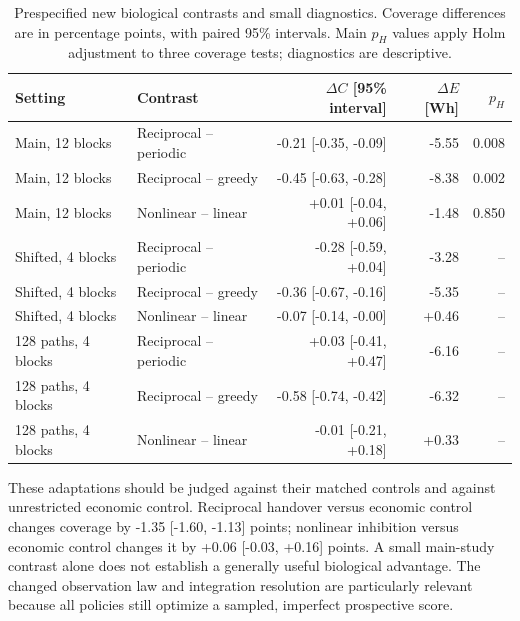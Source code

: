 \begin{table}[tbp]\centering\small
\caption{Prespecified new biological contrasts and small diagnostics. Coverage differences are in percentage points, with paired 95\% intervals. Main $p_H$ values apply Holm adjustment to three coverage tests; diagnostics are descriptive.}
\begin{tabular}{llrrr}\toprule Setting & Contrast & $\Delta C$ [95\% interval] & $\Delta E$ [Wh] & $p_H$\\\midrule
Main, 12 blocks & Reciprocal -- periodic & -0.21 [-0.35, -0.09] & -5.55 & 0.008 \\
Main, 12 blocks & Reciprocal -- greedy & -0.45 [-0.63, -0.28] & -8.38 & 0.002 \\
Main, 12 blocks & Nonlinear -- linear & +0.01 [-0.04, +0.06] & -1.48 & 0.850 \\
Shifted, 4 blocks & Reciprocal -- periodic & -0.28 [-0.59, +0.04] & -3.28 & -- \\
Shifted, 4 blocks & Reciprocal -- greedy & -0.36 [-0.67, -0.16] & -5.35 & -- \\
Shifted, 4 blocks & Nonlinear -- linear & -0.07 [-0.14, -0.00] & +0.46 & -- \\
128 paths, 4 blocks & Reciprocal -- periodic & +0.03 [-0.41, +0.47] & -6.16 & -- \\
128 paths, 4 blocks & Reciprocal -- greedy & -0.58 [-0.74, -0.42] & -6.32 & -- \\
128 paths, 4 blocks & Nonlinear -- linear & -0.01 [-0.21, +0.18] & +0.33 & -- \\
\bottomrule\end{tabular}\label{tab:v4contrasts}\end{table}
These adaptations should be judged against their matched controls and against unrestricted economic control. Reciprocal handover versus economic control changes coverage by -1.35 [-1.60, -1.13] points; nonlinear inhibition versus economic control changes it by +0.06 [-0.03, +0.16] points. A small main-study contrast alone does not establish a generally useful biological advantage. The changed observation law and integration resolution are particularly relevant because all policies still optimize a sampled, imperfect prospective score.
